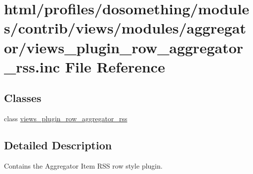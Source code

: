 \hypertarget{views__plugin__row__aggregator__rss_8inc}{
\section{html/profiles/dosomething/modules/contrib/views/modules/aggregator/views\_\-plugin\_\-row\_\-aggregator\_\-rss.inc File Reference}
\label{views__plugin__row__aggregator__rss_8inc}
}
\subsection*{Classes}
\begin{DoxyCompactItemize}
\item 
class \hyperlink{classviews__plugin__row__aggregator__rss}{views\_\-plugin\_\-row\_\-aggregator\_\-rss}
\end{DoxyCompactItemize}


\subsection{Detailed Description}
Contains the Aggregator Item RSS row style plugin. 